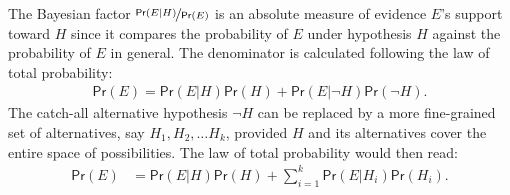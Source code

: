 \documentclass{article}
\newcommand{\pr}{\mathsf{Pr}}
\begin{document}
The Bayesian factor $\nicefrac{\pr(E \vert H)}{\pr(E)}$
is an absolute measure of evidence $E$'s support toward $H$ since it compares the probability of $E$ under hypothesis $H$ against the probability of $E$ in general. 
The denominator is calculated following the law of total probability:
%
\begin{align*}\pr(E)= \pr(E \vert H) \pr(H)+\pr(E \vert \neg H) \pr(\neg H).\end{align*}
%
The catch-all alternative hypothesis $\neg H$ can be replaced by a more fine-grained set of alternatives, say $H_1, H_2, \dots H_k$, provided $H$ and its alternatives cover the entire space of possibilities. The law of total probability would then read:
%
\begin{align*}
\pr(E) & = \pr(E\vert H)\pr(H) +\sum_{i=1}^k \pr(E\vert H_i)\pr(H_i). 
\end{align*}

%
%

%
\end{document}
